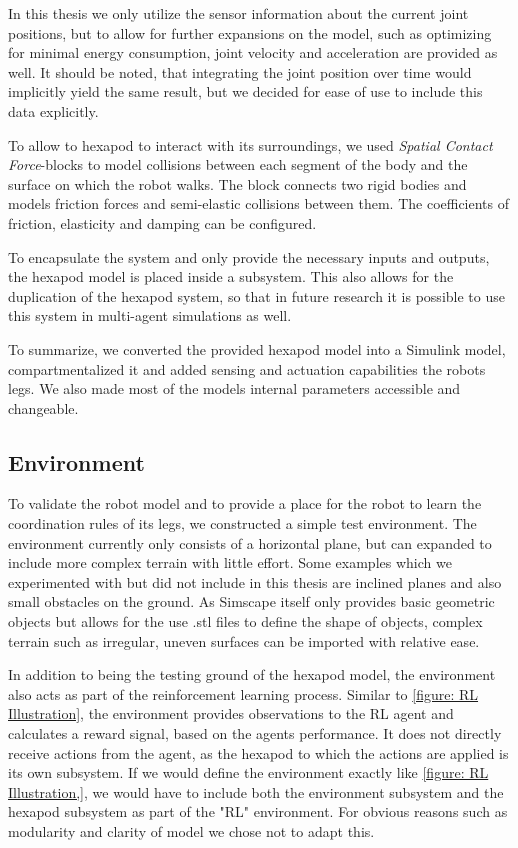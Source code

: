 In this thesis we only utilize the sensor information about the current joint positions, but to allow for further expansions on the model, such as optimizing for minimal energy consumption, joint velocity and acceleration are provided as well.
It should be noted, that integrating the joint position over time would implicitly yield the same result, but we decided for ease of use to include this data explicitly.

To allow to hexapod to interact with its surroundings, we used \textit{Spatial Contact Force}-blocks to model collisions between each segment of the body and the surface on which the robot walks.
The block connects two rigid bodies and models friction forces and semi-elastic collisions between them.
The coefficients of friction, elasticity and damping can be configured.

To encapsulate the system and only provide the necessary inputs and outputs, the hexapod model is placed inside a subsystem.
This also allows for the duplication of the hexapod system, so that in future research it is possible to use this system in multi-agent simulations as well.

To summarize, we converted the provided hexapod model into a Simulink model, compartmentalized it and added sensing and actuation capabilities the robots legs.
We also made most of the models internal parameters accessible and changeable.


\subsection{Environment}
To validate the robot model and to provide a place for the robot to learn the coordination rules of its legs, we constructed a simple test environment.
The environment currently only consists of a horizontal plane, but can expanded to include more complex terrain with little effort.
Some examples which we experimented with but did not include in this thesis are inclined planes and also small obstacles on the ground.
As Simscape itself only provides basic geometric objects but allows for the use .stl files to define the shape of objects, complex terrain such as irregular, uneven surfaces can be imported with relative ease.

In addition to being the testing ground of the hexapod model, the environment also acts as part of the reinforcement learning process.
Similar to \ref{figure: RL Illustration}, the environment provides observations to the RL agent and calculates a reward signal, based on the agents performance.
It does not directly receive actions from the agent, as the hexapod to which the actions are applied is its own subsystem.
If we would define the environment exactly like \ref{figure: RL Illustration,}, we would have to include both the environment subsystem and the hexapod subsystem as part of the "RL" environment.
For obvious reasons such as modularity and clarity of model we chose not to adapt this.

